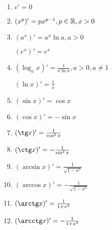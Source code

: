 \begin{enumerate}
    \item $c' = 0$
    \item  $(x^p)' = p x^{p-1}, p \in \mathbb{R}, x > 0$
    \item $(a^x)' = a^x \ln a, a > 0$

        $(e^x)' = e^x$
    \item  $(\log_a x)' = \frac{1}{x \ln a}, a > 0, a \neq 1$ 

        $(\ln x)' = \frac{1}{x}$ 
    \item $(\sin x)' = \cos x$
    \item  $(\cos x)' = -\sin x$
    \item  $(\tg x)' = \frac{1}{\cos^2 x}$
    \item $(\ctg x)' = -\frac{1}{\sin^2 x}$
    \item $(\arcsin x)' = \frac{1}{\sqrt{1-x^2}}$ 
    \item $(\arccos x)' = -\frac{1}{\sqrt{1-x^2}}$ 
    \item $(\arctg x)' = \frac{1}{1 + x^2}$ 
    \item $(\arcctg x)' = -\frac{1}{1+x^2}$
\end{enumerate}
